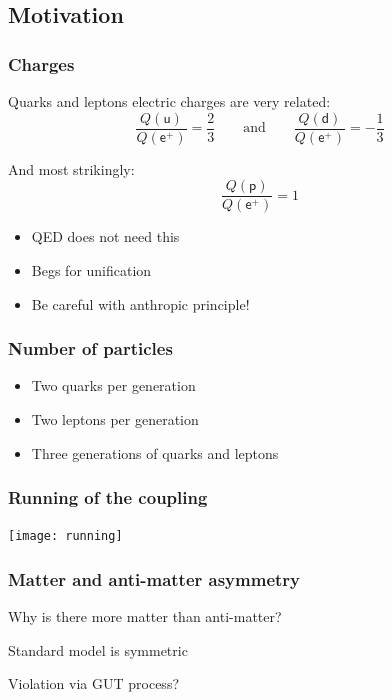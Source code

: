 \documentclass[english, fleqn]{beamer}
\newcommand\qqandqq{\qquad\text{and}\qquad}
\begin{document}
\subsection{Motivation}

\begin{frame}
    \frametitle{Charges}

    Quarks and leptons electric charges are very related:
    \[
        \frac{Q(\mathsf u)}{Q(\mathsf e^+)} = \frac 23
        \qqandqq
        \frac{Q(\mathsf d)}{Q(\mathsf e^+)} = - \frac 13
    \]

    \pause

    And most strikingly:
    \[
        \frac{Q(\mathsf p)}{Q(\mathsf e^+)} = 1
    \]

    \pause

    \begin{itemize}
        \item QED does not need this
        \item Begs for unification
        \item Be careful with anthropic principle!
    \end{itemize}
\end{frame}

\begin{frame}
    \frametitle{Number of particles}

    \begin{itemize}
        \item Two quarks per generation
        \item Two leptons per generation
        \item Three generations of quarks and leptons
    \end{itemize}
\end{frame}

\begin{frame}
    \frametitle{Running of the coupling}

    {
        \centering
        \texttt{[image: running]}
    }

    \parencite{Peskin/1997ez}
\end{frame}

\begin{frame}

    \frametitle{Matter and anti-matter asymmetry}

    Why is there more matter than anti-matter?

    Standard model is symmetric

    Violation via GUT process?
\end{frame}
\end{document}
